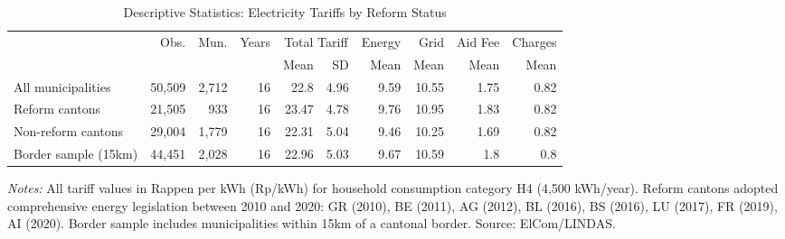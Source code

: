 \begin{table}[htbp]
\centering
\caption{Descriptive Statistics: Electricity Tariffs by Reform Status}
\label{tab:desc_stats}
\begin{adjustbox}{max width=\textwidth}
\begin{tabular}{lrrrrrrrrr}
\toprule
 & Obs. & Mun. & Years & \multicolumn{2}{c}{Total Tariff} & Energy & Grid & Aid Fee & Charges \\
 & & & & Mean & SD & Mean & Mean & Mean & Mean \\
\midrule
All municipalities & 50,509 & 2,712 & 16 & 22.8 & 4.96 & 9.59 & 10.55 & 1.75 & 0.82 \\
Reform cantons & 21,505 & 933 & 16 & 23.47 & 4.78 & 9.76 & 10.95 & 1.83 & 0.82 \\
Non-reform cantons & 29,004 & 1,779 & 16 & 22.31 & 5.04 & 9.46 & 10.25 & 1.69 & 0.82 \\
Border sample (15km) & 44,451 & 2,028 & 16 & 22.96 & 5.03 & 9.67 & 10.59 & 1.8 & 0.8 \\
\bottomrule
\end{tabular}
\end{adjustbox}
\begin{tablenotes}[flushleft]
\small
\item \textit{Notes:} All tariff values in Rappen per kWh (Rp/kWh) for household consumption category H4 (4,500 kWh/year). Reform cantons adopted comprehensive energy legislation between 2010 and 2020: GR (2010), BE (2011), AG (2012), BL (2016), BS (2016), LU (2017), FR (2019), AI (2020). Border sample includes municipalities within 15km of a cantonal border. Source: ElCom/LINDAS.
\end{tablenotes}
\end{table}
